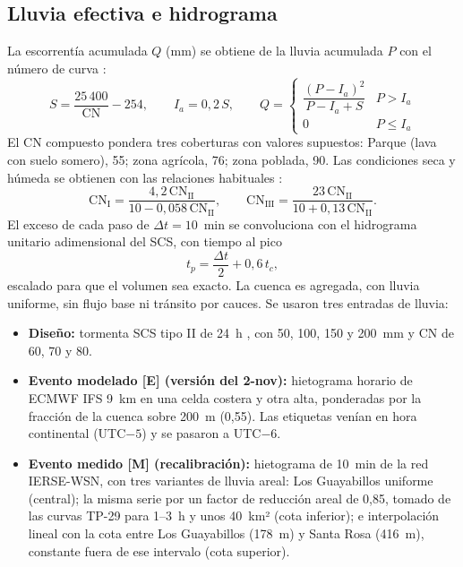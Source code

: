 \documentclass{sosg-informe}
\begin{document}
\subsection{Lluvia efectiva e hidrograma}
La escorrentía acumulada $Q$ (mm) se obtiene de la lluvia acumulada $P$ con el número de curva \citep{usda1986}:
\begin{equation}
  S = \frac{25\,400}{\mathrm{CN}} - 254, \qquad I_a = 0,2\,S, \qquad
  Q = \begin{cases} \dfrac{(P - I_a)^2}{P - I_a + S} & P > I_a \\[4pt] 0 & P \leq I_a \end{cases}
  \label{eq:scs}
\end{equation}
El CN compuesto pondera tres coberturas con valores supuestos: Parque (lava con suelo somero), 55; zona agrícola, 76; zona poblada, 90. Las condiciones seca y húmeda se obtienen con las relaciones habituales \citep{chow1988}:
\begin{equation}
  \mathrm{CN}_{\mathrm{I}} = \frac{4,2\,\mathrm{CN}_{\mathrm{II}}}{10 - 0,058\,\mathrm{CN}_{\mathrm{II}}}, \qquad
  \mathrm{CN}_{\mathrm{III}} = \frac{23\,\mathrm{CN}_{\mathrm{II}}}{10 + 0,13\,\mathrm{CN}_{\mathrm{II}}}.
\end{equation}
El exceso de cada paso de $\Delta t = 10$~min se convoluciona con el hidrograma unitario adimensional del SCS, con tiempo al pico
\begin{equation}
  t_p = \frac{\Delta t}{2} + 0,6\, t_c ,
\end{equation}
escalado para que el volumen sea exacto. La cuenca es agregada, con lluvia uniforme, sin flujo base ni tránsito por cauces. Se usaron tres entradas de lluvia:
\begin{itemize}
  \item \textbf{Diseño:} tormenta SCS tipo II de 24~h \citep{usda1986}, con 50, 100, 150 y 200~mm y CN de 60, 70 y 80.
  \item \textbf{Evento modelado [E] (versión del 2-nov):} hietograma horario de ECMWF IFS 9~km en una celda costera y otra alta, ponderadas por la fracción de la cuenca sobre 200~m (0,55). Las etiquetas venían en hora continental (UTC$-5$) y se pasaron a UTC$-6$.
  \item \textbf{Evento medido [M] (recalibración):} hietograma de 10~min de la red IERSE-WSN, con tres variantes de lluvia areal: Los Guayabillos uniforme (central); la misma serie por un factor de reducción areal de 0,85, tomado de las curvas TP-29 para 1--3~h y unos 40~km² \citep{tp29} (cota inferior); e interpolación lineal con la cota entre Los Guayabillos (178~m) y Santa Rosa (416~m), constante fuera de ese intervalo (cota superior).
\end{itemize}
\end{document}
